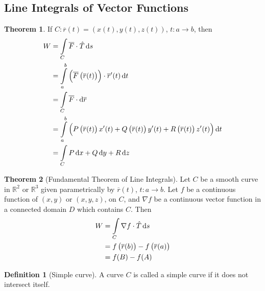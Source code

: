 \documentclass[fleqn, a4paper, 8pt, twoside]{amsart}
\theoremstyle{definition}
\theoremstyle{bluedefinition}
\newtheorem{definition}{Definition}
\theoremstyle{redtheorem}
\newtheorem{theorem}{Theorem}
\begin{document}
\begin{multicols}{2}
\begin{spacing}{0.7}
\section{Line Integrals of Vector Functions}

\begin{theorem}
	If $C : \overline{r}(t) = \left( x(t) , y(t) , z(t) \right)$, $t : a \to b$, then
	\begin{align*}
		W & =\int\limits_{C} \overline{F} \cdot \hat{T} \dif s                                                                                                                \\
                  & = \int\limits_{a}^{b} \left( \overline{F}\left( \overline{r}(t) \right) \right) \cdot {\overline{r}}'(t) \dif t                                                           \\
                  & = \int\limits_{C} \overline{F} \cdot \dif \overline{r}                                                                                                            \\
                  & = \int\limits_{a}^{b} \left( P\left( \overline{r}(t) \right) x'(t) + Q\left( \overline{r}(t) \right) y'(t) + R\left( \overline{r}(t) \right) z'(t) \right) \dif t \\
                  & = \int\limits_{C} P \dif x + Q \dif y + R \dif z
	\end{align*}
\end{theorem}

\begin{theorem}[Fundamental Theorem of Line Integrals]
	Let $C$ be a smooth curve in $\mathbb{R}^2$ or $\mathbb{R}^3$ given parametrically by $\overline{r}(t)$, $t : a \to b$.
	Let $f$ be a continuous function of $(x,y)$ or $(x,y,z)$, on $C$, and $\nabla f$ be a continuous vector function in a connected domain $D$ which contains $C$.
	Then
	\begin{align*}
		W & = \int\limits_{C} \nabla f \cdot \hat{T} \dif s                     \\
                  & = f\left( \overline{r}(b) \right) - f\left( \overline{r}(a) \right) \\
                  & = f(B) - f(A)
	\end{align*}
	\label{Fundamental_Theorem_of_Line_Integrals}
\end{theorem}

\begin{definition}[Simple curve]
	A curve $C$ is called a simple curve if it does not intersect itself.
\end{definition}


\end{spacing}
\end{multicols}
\end{document}
